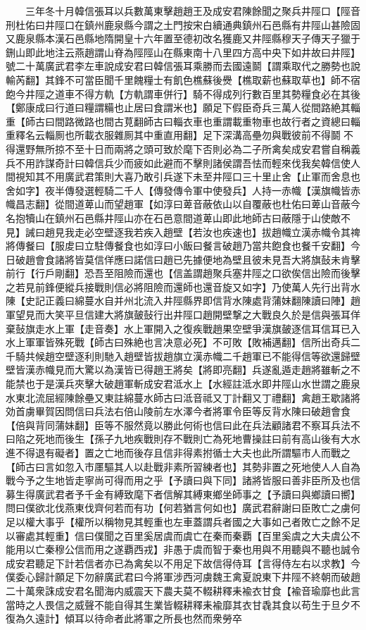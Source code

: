 　　三年冬十月韓信張耳以兵數萬東擊趙趙王及成安君陳餘聞之聚兵井陘口【陘音刑杜佑曰井陘口在鎮州鹿泉縣今謂之土門按宋白續通典鎮州石邑縣有井陘山甚險固又鹿泉縣本漢石邑縣地隋開皇十六年置至德初改名獲鹿又井陘縣穆天子傳天子獵于鉶山即此地注云燕趙謂山脊為陘陘山在縣東南十八里四方高中央下如井故曰井陘】號二十萬廣武君李左車說成安君曰韓信張耳乘勝而去國遠鬬【謂乘取代之勝勢也說輸芮翻】其鋒不可當臣聞千里餽糧士有飢色樵蘇後㸑【樵取薪也蘇取草也】師不宿飽今井陘之道車不得方軌【方軌謂車併行】騎不得成列行數百里其勢糧食必在其後【鄭康成曰行道曰糧謂糒也止居曰食謂米也】願足下假臣奇兵三萬人從間路絶其輜重【師古曰間路微路也間古莧翻師古曰輜衣車也重謂載重物車也故行者之資總曰輜重釋名云輜厠也所載衣服雜厠其中重直用翻】足下深溝高壘勿與戰彼前不得鬬不得還野無所掠不至十日而兩將之頭可致於麾下否則必為二子所禽矣成安君嘗自稱義兵不用詐謀奇計曰韓信兵少而疲如此避而不擊則諸侯謂吾怯而輕來伐我矣韓信使人間視知其不用廣武君策則大喜乃敢引兵遂下未至井陘口三十里止舍【止軍而舍息也舍如字】夜半傳發選輕騎二千人【傳發傳令軍中使發兵】人持一赤幟【漢旗幟皆赤幟昌志翻】從間道萆山而望趙軍【如淳曰萆音蔽依山以自覆蔽也杜佑曰萆山音蔽今名抱犢山在鎮州石邑縣井陘山亦在石邑意間道萆山即此地師古曰蔽隱于山使敵不見】誡曰趙見我走必空壁逐我若疾入趙壁【若汝也疾速也】拔趙幟立漢赤幟令其禆將傳餐曰【服䖍曰立駐傳餐食也如淳曰小飯曰餐言破趙乃當共飽食也餐千安翻】今日破趙會食諸將皆莫信佯應曰諾信曰趙已先據便地為壁且彼未見吾大將旗鼔未肯擊前行【行戶剛翻】恐吾至阻險而還也【信盖謂趙聚兵塞井陘之口欲俟信出險而後擊之若見前鋒便縱兵接戰則信必將阻險而還師也還音旋又如字】乃使萬人先行出背水陳【史記正義曰綿蔓水自并州北流入井陘縣界即信背水陳處背蒲妹翻陳讀曰陣】趙軍望見而大笑平旦信建大將旗皷鼔行出井陘口趙開壁撃之大戰良久於是信與張耳佯棄鼔旗走水上軍【走音奏】水上軍開入之復疾戰趙果空壁爭漢旗皷逐信耳信耳已入水上軍軍皆殊死戰【師古曰殊絶也言决意必死】不可敗【敗補邁翻】信所出奇兵二千騎共候趙空壁逐利則馳入趙壁皆拔趙旗立漢赤幟二千趙軍已不能得信等欲還歸壁壁皆漢赤幟見而大驚以為漢皆已得趙王將矣【將即亮翻】兵遂亂遁走趙將雖斬之不能禁也于是漢兵夾擊大破趙軍斬成安君泜水上【水經註泜水即井陘山水世謂之鹿泉水東北流屈經陳餘壘又東註綿蔓水師古曰泜音祗又丁計翻又丁禮翻】禽趙王歇諸將効首虜畢賀因問信曰兵法右倍山陵前左水澤今者將軍令臣等反背水陳曰破趙會食【倍與背同蒲妹翻】臣等不服然竟以勝此何術也信曰此在兵法顧諸君不察耳兵法不曰陷之死地而後生【孫子九地疾戰則存不戰則亡為死地曹操註曰前有高山後有大水進不得退有礙者】置之亡地而後存且信非得素拊循士大夫也此所謂驅市人而戰之【師古曰言如忽入市㕓驅其人以赴戰非素所習練者也】其勢非置之死地使人人自為戰今予之生地皆走寧尚可得而用之乎【予讀曰與下同】諸將皆服曰善非臣所及也信募生得廣武君者予千金有縛致麾下者信解其縛東鄉坐師事之【予讀曰與鄉讀曰嚮】問曰僕欲北伐燕東伐齊何若而有功【何若猶言何如也】廣武君辭謝曰臣敗亡之虜何足以權大事乎【權所以稱物見其輕重也左車蓋謂兵者國之大事如己者敗亡之餘不足以審處其輕重】信曰僕聞之百里奚居虞而虞亡在秦而秦覇【百里奚虞之大夫虞公不能用以亡秦穆公信而用之遂覇西戎】非愚于虞而智于秦也用與不用聽與不聽也誠令成安君聽足下計若信者亦已為禽矣以不用足下故信得侍耳【言得侍左右以求教】今僕委心歸計願足下勿辭廣武君曰今將軍涉西河虜魏王禽夏說東下井陘不終朝而破趙二十萬衆誅成安君名聞海内威震天下農夫莫不輟耕釋耒褕衣甘食【褕音瑜靡也此言當時之人畏信之威聲不能自得其生業皆輟耕釋耒褕靡其衣甘毳其食以苟生于旦夕不復為久遠計】傾耳以待命者此將軍之所長也然而衆勞卒